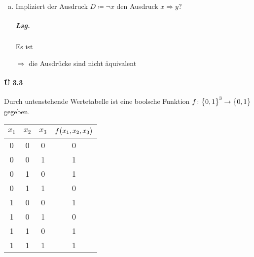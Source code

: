 \documentclass{scrreprt}
\begin{document}
\begin{enumerate}[(a)]
\item Impliziert der Ausdruck $D \coloneqq \neg x$ den Ausdruck $x \Rightarrow y$?

  \subparagraph{Lsg.} Es ist

  $\Rightarrow$ die Ausdrücke sind nicht äquivalent
\end{enumerate}

\newpage
\paragraph{Ü 3.3} Durch untenstehende Wertetabelle ist eine boolsche Funktion
$f \colon \qty\big{0, 1}^3 \to \qty\big{0, 1}$ gegeben.

\begin{tabular}{|c|c|c|c|}
  \hline
  $x_1$ & $x_2$ & $x_3$ & $f\qty\big(x_1, x_2, x_3)$ \\
  \hline
  0 & 0 & 0 & 0 \\
  0 & 0 & 1 & 1 \\
  0 & 1 & 0 & 1 \\
  0 & 1 & 1 & 0 \\
  1 & 0 & 0 & 1 \\
  1 & 0 & 1 & 0 \\
  1 & 1 & 0 & 1 \\
  1 & 1 & 1 & 1 \\
  \hline
\end{tabular}
\end{document}
